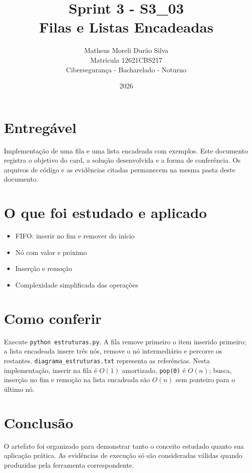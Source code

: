 \documentclass[12pt]{article}
\title{Sprint 3 - S3\_03\\Filas e Listas Encadeadas}
\author{Matheus Moreli Durão Silva\\Matrícula 12621CBS217\\Cibersegurança - Bacharelado - Noturno}
\date{2026}
\begin{document}
\maketitle

\section*{Entregável}
Implementação de uma fila e uma lista encadeada com exemplos. Este documento registra o objetivo do card, a solução desenvolvida e a forma de conferência. Os arquivos de código e as evidências citadas permanecem na mesma pasta deste documento.

\section*{O que foi estudado e aplicado}
\begin{itemize}
\item FIFO: inserir no fim e remover do início
\item Nó com valor e próximo
\item Inserção e remoção
\item Complexidade simplificada das operações
\end{itemize}

\section*{Como conferir}
Execute \texttt{python estruturas.py}. A fila remove primeiro o item inserido primeiro; a lista encadeada insere três nós, remove o nó intermediário e percorre os restantes. \texttt{diagrama\_estruturas.txt} representa as referências. Nesta implementação, inserir na fila é $O(1)$ amortizado, \texttt{pop(0)} é $O(n)$; busca, inserção no fim e remoção na lista encadeada são $O(n)$ sem ponteiro para o último nó.

\section*{Conclusão}
O artefato foi organizado para demonstrar tanto o conceito estudado quanto sua aplicação prática. As evidências de execução só são consideradas válidas quando produzidas pela ferramenta correspondente.
\end{document}
